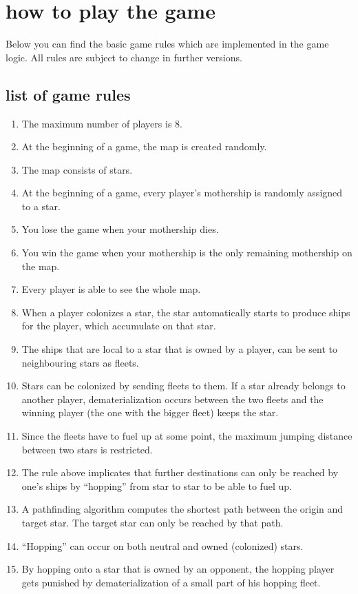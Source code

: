 \chapter*{how to play the game}
Below you can find the basic game rules which are implemented in the game logic. All rules are subject to change in further versions.

\section*{list of game rules}
\begin{enumerate}
	\item The maximum number of players is 8.
	\item At the beginning of a game, the map is created randomly.
	\item The map consists of stars.
	\item At the beginning of a game, every player's mothership is randomly assigned to a star.
	\item You lose the game when your mothership dies.
	\item You win the game when your mothership is the only remaining mothership on the map.
	\item Every player is able to see the whole map.
	\item When a player colonizes a star, the star automatically starts to produce ships for the player, which accumulate on that star.
	\item The ships that are local to a star that is owned by a player, can be sent to neighbouring stars as fleets.
	\item Stars can be colonized by sending fleets to them. If a star already belongs to another player, dematerialization occurs between the two fleets and the winning player (the one with the bigger fleet) keeps the star.
	\item Since the fleets have to fuel up at some point, the maximum jumping distance between two stars is restricted.
	\item The rule above implicates   that further destinations can only be reached by one's ships by ``hopping'' from star to star to be able to fuel up.
	\item A pathfinding algorithm computes the shortest path between the origin and target star. The target star can only be reached by that path.
	\item ``Hopping'' can occur on both neutral and owned (colonized) stars.
	\item By hopping onto a star that is owned by an opponent, the hopping player gets punished by dematerialization of a small part of his hopping fleet.

\end{enumerate}
